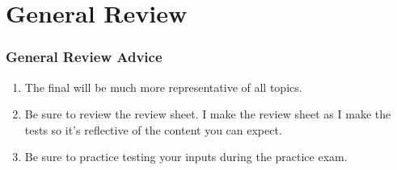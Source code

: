 \documentclass[xcolor=table]{beamer}
\begin{document}
\section{General Review}
\begin{frame}[fragile]
    \frametitle{General Review Advice}
    \begin{enumerate}[A]
        \item The final will be much more representative of all topics.
        \item Be sure to review the review sheet. I make the review sheet as I make the tests so it's reflective of the content you can expect. 
        \item Be sure to practice testing your inputs during the practice exam.
    \end{enumerate}
\end{frame}
\end{document}
